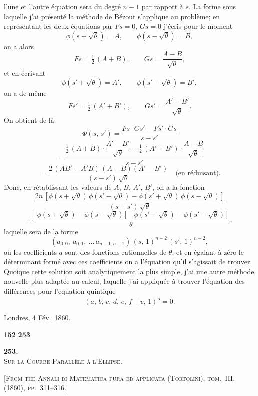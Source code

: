 \documentclass[11pt]{article}
\newcommand{\Cdel}{\mid}
\begin{document}
\medskip

\noindent l'une et l'autre équation sera du degré $n - 1$ par rapport à $s$. La forme sous laquelle j'ai présenté la méthode de Bézout s'applique au problème; en représentant les deux équations par $Fs = 0$, $Gs = 0$ j'écris pour le moment
\[
\phi(s + \sqrt{\theta}) = A,\qquad \phi(s - \sqrt{\theta}) = B,
\]
on a alors
\[
Fs = \tfrac{1}{2}\,(A + B),\qquad Gs = \frac{A - B}{\sqrt{\theta}},
\]
et en écrivant
\[
\phi(s' + \sqrt{\theta}) = A',\qquad \phi(s' - \sqrt{\theta}) = B',
\]
on a de même
\[
Fs' = \tfrac{1}{2}\,(A' + B'),\qquad Gs' = \frac{A' - B'}{\sqrt{\theta}}.
\]
On obtient de là
\[
\Phi(s,\,s') = \frac{Fs\cdot Gs' - Fs'\cdot Gs}{s - s'}
\]
\[
= \frac{\tfrac{1}{2}\,(A + B)\cdot\dfrac{A' - B'}{\sqrt{\theta}} - \tfrac{1}{2}\,(A' + B')\cdot\dfrac{A - B}{\sqrt{\theta}}}{s - s'}
\]
\[
= \frac{2\,(AB' - A'B)\,(A - B)(A' - B')}{(s - s')\,\sqrt{\theta}}\quad\text{(en réduisant).}
\]
Donc, en rétablissant les valeurs de $A$, $B$, $A'$, $B'$, on a la fonction
\[
\frac{2n\,[\phi(s + \sqrt{\theta})\,\phi(s' - \sqrt{\theta}) - \phi(s' + \sqrt{\theta})\,\phi(s - \sqrt{\theta})]}{(s - s')\,\sqrt{\theta}}
\]
\[
+ \frac{[\phi(s + \sqrt{\theta}) - \phi(s - \sqrt{\theta})]\,[\phi(s' + \sqrt{\theta}) - \phi(s' - \sqrt{\theta})]}{\theta},
\]
laquelle sera de la forme
\[
(a_{0,0},\ a_{0,1},\ \ldots\,a_{n-1,n-1})\,(s,\,1)^{n-2}\,(s',\,1)^{n-2},
\]
où les coefficients $a$ sont des fonctions rationnelles de $\theta$, et en égalant à zéro le déterminant formé avec ces coefficients on a l'équation qu'il s'agissait de trouver. Quoique cette solution soit analytiquement la plus simple, j'ai une autre méthode nouvelle plus adaptée au calcul, laquelle j'ai appliquée à trouver l'équation des différences pour l'équation quintique
\[
(a,\,b,\,c,\,d,\,e,\,f\,\!\Cdel\,v,\,1)^{5} = 0.
\]

\medskip

\noindent Londres, 4 Fév.~1860.

\newpage

\noindent\textbf{152}\hfill\hfill\textbf{[253}

\medskip

\begin{center}
\textbf{253.}\\[0.6em]
{\Large\textsc{Sur la Courbe Parallèle à l'Ellipse.}}
\end{center}

\medskip

\textsc{[From the Annali di Matematica pura ed applicata (Tortolini), tom.~III. (1860), pp.~311--316.]}
\end{document}
